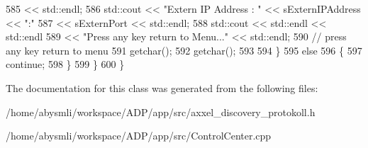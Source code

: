 \begin{DoxyCode}
585                     << std::endl;
586             std::cout << \textcolor{stringliteral}{"Extern IP Address : "} << sExternIPAddress << \textcolor{stringliteral}{":"}
587                     << sExternPort << std::endl;
588             std::cout << std::endl << std::endl
589                     << \textcolor{stringliteral}{"Press any key return to Menu..."} << std::endl;
590             \textcolor{comment}{// press any key return to menu}
591             getchar();
592             getchar();
593 
594         \}
595         \textcolor{keywordflow}{else}
596         \{
597             \textcolor{keywordflow}{continue};
598         \}
599     \}
600 \}
\end{DoxyCode}


The documentation for this class was generated from the following files\-:\begin{DoxyCompactItemize}
\item 
/home/abysmli/workspace/\-A\-D\-P/app/src/axxel\-\_\-discovery\-\_\-protokoll.\-h\item 
/home/abysmli/workspace/\-A\-D\-P/app/src/Control\-Center.\-cpp\end{DoxyCompactItemize}
